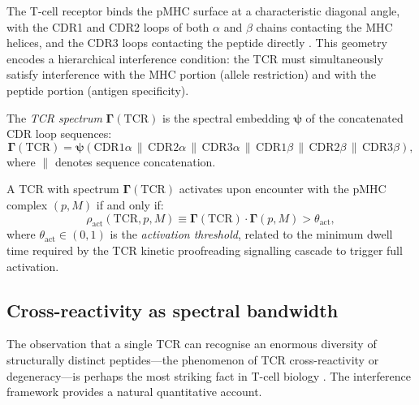 The T-cell receptor binds the pMHC surface at a characteristic diagonal angle,
with the CDR1 and CDR2 loops of both $\alpha$ and $\beta$ chains contacting
the MHC helices, and the CDR3 loops contacting the peptide directly
\citep{davis1988}. This geometry encodes a hierarchical interference condition:
the TCR must simultaneously satisfy interference with the MHC portion (allele
restriction) and with the peptide portion (antigen specificity).

\begin{definition}
\label{im:def:tcr_spectrum}
The \emph{TCR spectrum} $\bm{\Gamma}(\mathrm{TCR})$ is the spectral
embedding $\bm{\psi}$ of the concatenated CDR loop sequences:
\begin{equation}
  \bm{\Gamma}(\mathrm{TCR})
  = \bm{\psi}(\mathrm{CDR1}\alpha \,\|\,
              \mathrm{CDR2}\alpha \,\|\,
              \mathrm{CDR3}\alpha \,\|\,
              \mathrm{CDR1}\beta  \,\|\,
              \mathrm{CDR2}\beta  \,\|\,
              \mathrm{CDR3}\beta),
  \label{im:eq:tcr_spectrum}
\end{equation}
where $\|$ denotes sequence concatenation.
\end{definition}

\begin{definition}
\label{im:def:tcr_activation}
A TCR with spectrum $\bm{\Gamma}(\mathrm{TCR})$ activates upon encounter
with the pMHC complex $(p, M)$ if and only if:
\begin{equation}
  \rho_{\mathrm{act}}(\mathrm{TCR}, p, M)
  \equiv \bm{\Gamma}(\mathrm{TCR})\cdot\bm{\Gamma}(p,M) > \theta_{\mathrm{act}},
  \label{im:eq:tcr_activation}
\end{equation}
where $\theta_{\mathrm{act}} \in (0,1)$ is the \emph{activation threshold},
related to the minimum dwell time required by the TCR kinetic proofreading
signalling cascade to trigger full activation.
\end{definition}

\subsection{Cross-reactivity as spectral bandwidth}
\label{im:sec:cross_reactivity}

The observation that a single TCR can recognise an enormous diversity of
structurally distinct peptides---the phenomenon of TCR cross-reactivity or
degeneracy---is perhaps the most striking fact in T-cell biology
\citep{mason1998,wooldridge2012}. The interference framework provides a
natural quantitative account.

